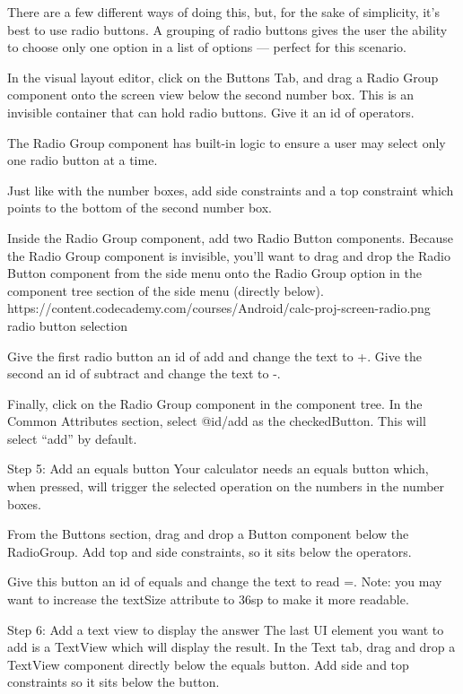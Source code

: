         There are a few different ways of doing this, but, for the sake of simplicity, it’s best to use radio buttons. A grouping of radio buttons gives the user the ability to choose only one option in a list of options — perfect for this scenario.

        In the visual layout editor, click on the Buttons Tab, and drag a Radio Group component onto the screen view below the second number box. This is an invisible container that can hold radio buttons. Give it an id of operators.

        The Radio Group component has built-in logic to ensure a user may select only one radio button at a time.

        Just like with the number boxes, add side constraints and a top constraint which points to the bottom of the second number box.

        Inside the Radio Group component, add two Radio Button components. Because the Radio Group component is invisible, you’ll want to drag and drop the Radio Button component from the side menu onto the Radio Group option in the component tree section of the side menu (directly below).
            🎨https://content.codecademy.com/courses/Android/calc-proj-screen-radio.png
                radio button selection

        Give the first radio button an id of add and change the text to +. Give the second an id of subtract and change the text to -.

        Finally, click on the Radio Group component in the component tree. In the Common Attributes section, select @id/add as the checkedButton. This will select “add” by default.

    Step 5: Add an equals button
        Your calculator needs an equals button which, when pressed, will trigger the selected operation on the numbers in the number boxes.

        From the Buttons section, drag and drop a Button component below the RadioGroup. Add top and side constraints, so it sits below the operators.

        Give this button an id of equals and change the text to read =. Note: you may want to increase the textSize attribute to 36sp to make it more readable.

    Step 6: Add a text view to display the answer
        The last UI element you want to add is a TextView which will display the result. In the Text tab, drag and drop a TextView component directly below the equals button. Add side and top constraints so it sits below the button.

